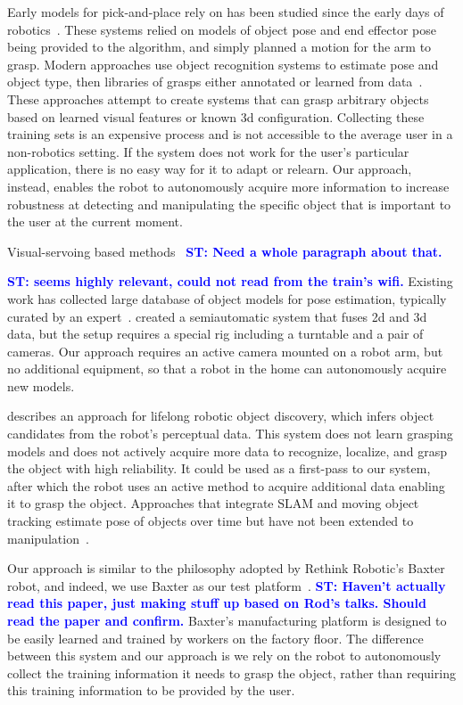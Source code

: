 \documentclass{article}
\newcommand{\stnote}[1]{\textcolor{blue}{\textbf{ST: #1}}}
\begin{document}
Early models for pick-and-place rely on has been studied since the
early days of robotics~\citep{brooks83, lozano89}.  These systems
relied on models of object pose and end effector pose being provided to the
algorithm, and simply planned a motion for the arm to grasp.  Modern
approaches use object recognition systems to estimate pose and object
type, then libraries of grasps either annotated or learned from
data~\citep{saxena08, goldfeder09, morales03}.  These approaches
attempt to create systems that can grasp arbitrary objects based on
learned visual features or known 3d configuration.  Collecting these
training sets is an expensive process and is not accessible to the
average user in a non-robotics setting.  If the system does not work
for the user's particular application, there is no easy way for it to
adapt or relearn.  Our approach, instead, enables the robot to
autonomously acquire more information to increase robustness at
detecting and manipulating the specific object that is important to
the user at the current moment.

Visual-servoing based methods~\citep{chaumette06} \stnote{Need a whole
  paragraph about that. }

\stnote{\citet{ciocarlie14} seems highly relevant, could not read from
  the train's wifi.}  Existing work has collected large database of
object models for pose estimation, typically curated by an
expert~\citep{lai11}.  \citet{kasper12} created a semiautomatic system
that fuses 2d and 3d data, but the setup requires a special rig
including a turntable and a pair of cameras.  Our approach requires an
active camera mounted on a robot arm, but no additional equipment, so
that a robot in the home can autonomously acquire new models.

\citet{collect14} describes an approach for lifelong robotic object
discovery, which infers object candidates from the robot's perceptual
data.  This system does not learn grasping models and does not
actively acquire more data to recognize, localize, and grasp the
object with high reliability.  It could be used as a first-pass to
our system, after which the robot uses an active method to acquire
additional data enabling it to grasp the object.  Approaches that
integrate SLAM and moving object tracking estimate pose of objects
over time but have not been extended to manipulation~\citep{wang07,
  gallagher09, salas-moreno13, selvatici08}.

Our approach is similar to the philosophy adopted by Rethink Robotic's
Baxter robot, and indeed, we use Baxter as our test
platform~\citep{fitzgerald13}.  \stnote{Haven't actually read this
  paper, just making stuff up based on Rod's talks.  Should read the
  paper and confirm.}  Baxter's manufacturing platform is designed to
be easily learned and trained by workers on the factory floor.  The
difference between this system and our approach is we rely on the
robot to autonomously collect the training information it needs to
grasp the object, rather than requiring this training information to
be provided by the user.
\end{document}
